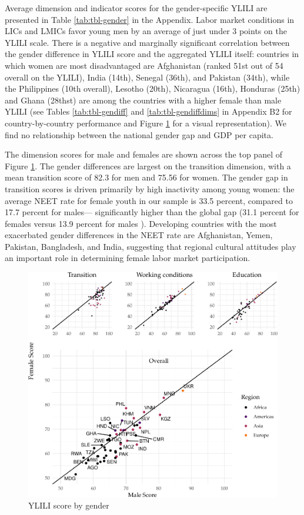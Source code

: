 \documentclass[
  a4paper, twoside, 12pt]{book}
\begin{document}
Average dimension and indicator scores for the gender-specific YLILI are presented in Table \ref{tab:tbl-gender} in the Appendix. Labor market conditions in LICs and LMICs favor young men by an average of just under 3 points on the YLILI scale. There is a negative and marginally significant correlation between the gender difference in YLILI score and the aggregated YLILI itself: countries in which women are most disadvantaged are Afghanistan (ranked 51st out of 54 overall on the YLILI), India (14th), Senegal (36th), and Pakistan (34th), while the Philippines (10th overall), Lesotho (20th), Nicaragua (16th), Honduras (25th) and Ghana (28thst) are among the countries with a higher female than male YLILI (see Tables \ref{tab:tbl-gendiff} and \ref{tab:tbl-gendiffdims} in Appendix B2 for country-by-country performance and Figure \ref{fig:fig-gendercorr} for a visual representation). We find no relationship between the national gender gap and GDP per capita.

The dimension scores for male and females are shown across the top panel of Figure \ref{fig:fig-gendercorr}. The gender differences are largest on the transition dimension, with a mean transition score of 82.3 for men and 75.56 for women. The gender gap in transition scores is driven primarily by high inactivity among young women: the average NEET rate for female youth in our sample is 33.5 percent, compared to 17.7 percent for males--- significantly higher than the global gap (31.1 percent for females versus 13.9 percent for males \autocite{ilo2023b}). Developing countries with the most exacerbated gender differences in the NEET rate are Afghanistan, Yemen, Pakistan, Bangladesh, and India, suggesting that regional cultural attitudes play an important role in determining female labor market participation.

\begin{figure}[H]

{\centering \includegraphics{figures/fig-gendercorr-1} 

}

\caption{YLILI score by gender}\label{fig:fig-gendercorr}
\end{figure}
\end{document}
